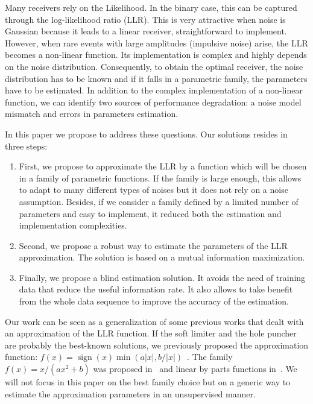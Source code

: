 \documentclass[a4paper]{IEEEtran}
\DeclareMathOperator\sign{sign}
\begin{document}
Many receivers rely on the Likelihood. In the binary case,
this can be captured through the log-likelihood ratio (LLR).
This is very attractive when noise is Gaussian because it
leads to a linear receiver, straightforward to implement.
However, when rare events with large amplitudes (impulsive
noise) arise, the LLR becomes a non-linear function. Its
implementation is complex and highly depends on the noise
distribution. Consequently, to obtain the optimal receiver,
the noise distribution has to be known and if it falls in
a parametric family, the parameters have to be estimated. In
addition to the complex implementation of a non-linear
function, we can identify two sources of performance
degradation: a noise model mismatch and errors in parameters
estimation.

In this paper we propose to address these questions. Our
solutions resides in three steps:
\begin{enumerate}
\item First, we propose to approximate the LLR by a function
  which will be chosen in a family of parametric functions.
  If the family is large enough, this allows to adapt to
  many different types of noises but it does not rely on
  a noise assumption. Besides, if we consider a family
  defined by a limited number of parameters and easy to
  implement, it reduced both the estimation and
  implementation complexities.
\item Second, we propose a robust way to estimate the
  parameters of the LLR approximation. The solution is based
  on a mutual information maximization.
\item Finally, we propose a blind estimation solution. It
  avoids the need of training data that reduce the useful
  information rate. It also allows to take benefit from the
  whole data sequence to improve the accuracy of the
  estimation.
\end{enumerate}

Our work can be seen as a generalization of some previous
works that dealt with an approximation of the LLR function.
If the soft limiter and the hole puncher are probably the
best-known solutions, we previously proposed the
approximation function: $f(x)=\sign(x)\min(a\lvert
x\rvert,b/\lvert x\rvert)$~\cite{VALG-2014}. The family
$f(x)=x/(ax^2+b)$ was proposed in~\cite{YRL-2014} and linear
by parts functions in~\cite{CRB-2017}. We will not focus in
this paper on the best family choice but on a generic way to
estimate the approximation parameters in an unsupervised
manner.
\end{document}
